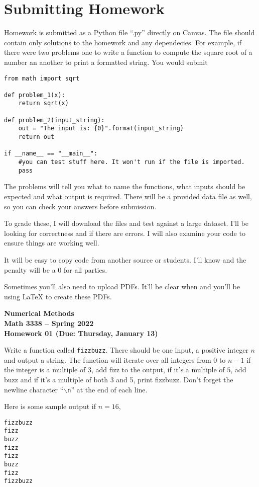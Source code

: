 \documentclass[11pt,letterpaper]{article}
\newcommand{\semester}{Spring 2022}
\newcommand{\due}{Thursday, January 13}
\begin{document}
\section{Submitting Homework}
Homework is submitted as a Python file ``.py'' directly on Canvas. The file should contain only 
solutions to the homework and any dependecies. For example, if there were two problems one to write 
a function to compute the square root of a number an another to print a formatted string. You would
submit
\begin{verbatim}
from math import sqrt

def problem_1(x):
    return sqrt(x)

def problem_2(input_string):
    out = "The input is: {0}".format(input_string)
    return out

if __name__ == "__main__":
    #you can test stuff here. It won't run if the file is imported.
    pass
\end{verbatim}
The problems will tell you what to name the functions, what inputs should be expected and what 
output is required. There will be a provided data file as well, so you can check your answers 
before submission.

To grade these, I will download the files and test against a large dataset. I'll be looking for
correctness and if there are errors. I will also examine your code to ensure things are working
well.

It will be easy to copy code from another source or students. I'll know and the penalty will be a
0 for all parties.

Sometimes you'll also need to upload PDFs. It'll be clear when and you'll be using LaTeX to create these PDFs. 








\newpage

\begin{center}
{\huge{\bf  Numerical Methods}} \\[1.5ex]
{\bf Math 3338 -- \semester}\\[1.5ex]
{\Large{\bf Homework 01 (Due: \due)}}\\
\end{center}
\vspace{2mm}



\begin{problem}
 Write a function called \texttt{fizzbuzz}. There should be one input, a positive integer $n$ and output a string. The function will iterate over all integers from 0 to $n-1$ if the integer is a multiple of $3$, add fizz to the output, if it's a multiple of $5$, add buzz and if it's a multiple of both 3 and 5, print fizzbuzz. Don't forget the newline character ``\texttt{$\backslash$n}'' at the end of each line.

Here is some sample output if $n=16$,
\begin{verbatim}
fizzbuzz
fizz
buzz
fizz
fizz
buzz
fizz
fizzbuzz
\end{verbatim}
\end{problem}
\end{document}
